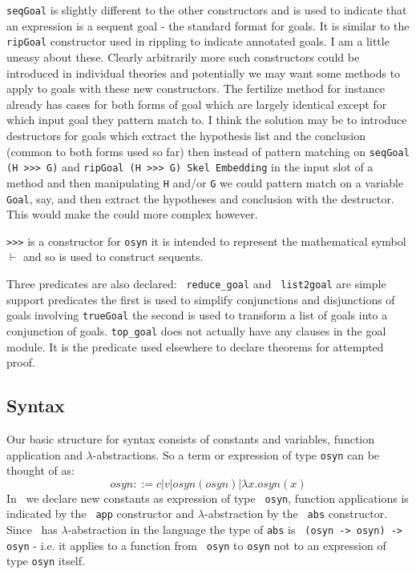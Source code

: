 {\tt seqGoal} is slightly different to the other
constructors and is used to indicate that an expression is a sequent
goal - the standard format for goals.  It is similar to the {\tt
  ripGoal} constructor used in rippling to indicate
annotated goals.  I am a little uneasy about these.  Clearly
arbitrarily more such constructors could be introduced in individual
theories and potentially we may want some methods to apply to goals
with these new constructors.  The fertilize method for instance already has cases for both forms of goal which
are largely identical except for which input goal they pattern match
to.  I think the solution may be to introduce destructors for goals
which extract the hypothesis list and the conclusion (common to both
forms used so far) then instead of pattern matching on {\tt seqGoal (H 
  >>> G)} and {\tt ripGoal (H >>> G) Skel Embedding} in the input slot 
of a method and then
manipulating {\tt H} and/or {\tt G} we could pattern match on a
variable {\tt Goal}, say, and then extract the hypotheses and
conclusion with the destructor.  This would make the could more
complex however.

{\tt >>>}\index{>>>} is a constructor for {\tt osyn} it is 
intended to represent the mathematical symbol $\vdash$ and so is used
to construct sequents.

Three predicates are also declared: {\tt
  reduce\_goal} and {\tt
  list2goal} are simple support predicates the first
is used to simplify conjunctions and disjunctions of goals involving
{\tt trueGoal} the second is used to transform a list
of goals into a conjunction of goals.  {\tt top\_goal} 
does not actually have any clauses in the goal module.  It is the predicate used elsewhere to declare theorems for 
attempted proof.

\subsection{Syntax}
Our basic structure for syntax consists of constants and variables,
function application and $\lambda$-abstractions.  So a
term or expression of type {\tt osyn} can be
thought of as:
\begin{equation}
osyn ::= c | v | osyn(osyn) | \lambda x. osyn(x) \nonumber
\end{equation}
In \lprolog\ we declare new constants as expression of type {\tt
  osyn}, function applications is indicated by the {\tt
  app} constructor and $\lambda$-abstraction by the {\tt
  abs} constructor.  Since \lprolog\ has
$\lambda$-abstraction in the language the type of {\tt abs} is {\tt
  (osyn -> osyn) -> osyn} - i.e. it applies to a function from {\tt
  osyn} to {\tt osyn} not to an expression of type {\tt osyn} itself.

